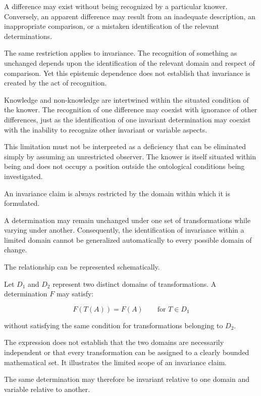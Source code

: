 A difference may exist without being recognized
by a particular knower. Conversely, an apparent
difference may result from an inadequate
description, an inappropriate comparison,
or a mistaken identification of the relevant
determinations.

The same restriction applies to invariance.
The recognition of something as unchanged
depends upon the identification of the relevant
domain and respect of comparison. Yet this
epistemic dependence does not establish that
invariance is created by the act of recognition.

Knowledge and non-knowledge are intertwined
within the situated condition of the knower.
The recognition of one difference may coexist
with ignorance of other differences, just as
the identification of one invariant determination
may coexist with the inability to recognize
other invariant or variable aspects.

This limitation must not be interpreted as
a deficiency that can be eliminated simply
by assuming an unrestricted observer. The
knower is itself situated within being and
does not occupy a position outside the
ontological conditions being investigated.


An invariance claim is always restricted by
the domain within which it is formulated.

A determination may remain unchanged under
one set of transformations while varying
under another. Consequently, the identification
of invariance within a limited domain cannot
be generalized automatically to every possible
domain of change.

The relationship can be represented schematically.

Let \(D_1\) and \(D_2\) represent two distinct
domains of transformations. A determination
\(F\) may satisfy:

\[
F(T(A)) = F(A)
\qquad
\text{for } T \in D_1
\]

without satisfying the same condition for
transformations belonging to \(D_2\).

The expression does not establish that the
two domains are necessarily independent or
that every transformation can be assigned
to a clearly bounded mathematical set. It
illustrates the limited scope of an invariance
claim.

The same determination may therefore be
invariant relative to one domain and variable
relative to another.

